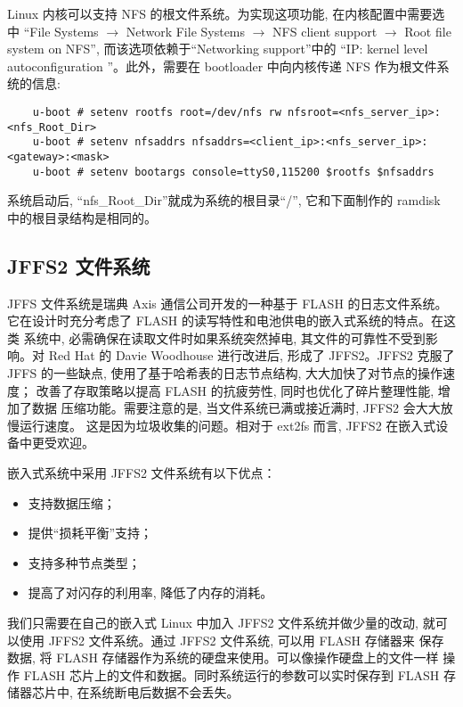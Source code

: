 	Linux 内核可以支持 NFS 的根文件系统。为实现这项功能, 在内核配置中需要选中
``File Systems $\to$ Network File Systems $\to$  NFS client support  $\to$
 Root file system on NFS'', 而该选项依赖于``Networking support''中的
``IP: kernel level autoconfiguration ''。此外，需要在 bootloader 中向内核传递
NFS 作为根文件系统的信息:

\begin{boxedminipage}{.9\textwidth}
\begin{verbatim}
	u-boot # setenv rootfs root=/dev/nfs rw nfsroot=<nfs_server_ip>:<nfs_Root_Dir>
	u-boot # setenv nfsaddrs nfsaddrs=<client_ip>:<nfs_server_ip>:<gateway>:<mask>
	u-boot # setenv bootargs console=ttyS0,115200 $rootfs $nfsaddrs
\end{verbatim}
\end{boxedminipage}

	系统启动后, ``nfs\_Root\_Dir''就成为系统的根目录``/'', 它和下面制作的
ramdisk 中的根目录结构是相同的。

\subsection{JFFS2 文件系统}
	JFFS 文件系统是瑞典 Axis 通信公司开发的一种基于 FLASH 的日志文件系统。
它在设计时充分考虑了 FLASH 的读写特性和电池供电的嵌入式系统的特点。在这类
系统中, 必需确保在读取文件时如果系统突然掉电, 其文件的可靠性不受到影响。对
Red Hat 的 Davie Woodhouse 进行改进后, 形成了 JFFS2。JFFS2 克服了 JFFS
的一些缺点, 使用了基于哈希表的日志节点结构, 大大加快了对节点的操作速度；
改善了存取策略以提高 FLASH 的抗疲劳性, 同时也优化了碎片整理性能, 增加了数据
压缩功能。需要注意的是, 当文件系统已满或接近满时, JFFS2 会大大放慢运行速度。
这是因为垃圾收集的问题。相对于 ext2fs 而言, JFFS2 在嵌入式设备中更受欢迎。

	嵌入式系统中采用 JFFS2 文件系统有以下优点：
\begin{itemize}\itemsep=-3pt
  \item 支持数据压缩；
  \item 提供``损耗平衡''支持；
  \item 支持多种节点类型；
  \item 提高了对闪存的利用率, 降低了内存的消耗。
\end{itemize}

	我们只需要在自己的嵌入式 Linux 中加入 JFFS2 文件系统并做少量的改动, 
就可以使用 JFFS2 文件系统。通过 JFFS2 文件系统, 可以用 FLASH 存储器来
保存数据, 将 FLASH 存储器作为系统的硬盘来使用。可以像操作硬盘上的文件一样
操作 FLASH 芯片上的文件和数据。同时系统运行的参数可以实时保存到 FLASH
存储器芯片中, 在系统断电后数据不会丢失。

